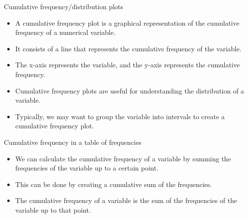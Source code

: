 \documentclass[
  10pt,
  ignorenonframetext,
]{beamer}
\begin{document}
\begin{frame}{Cumulative frequency/distribution plots}
\label{cumulative-frequencydistribution-plots}
\begin{itemize}
\item
  A cumulative frequency plot is a graphical representation of the
  cumulative frequency of a numerical variable.
\item
  It consists of a line that represents the cumulative frequency of the
  variable.
\item
  The x-axis represents the variable, and the y-axis represents the
  cumulative frequency.
\item
  Cumulative frequency plots are useful for understanding the
  distribution of a variable.
\item
  Typically, we may want to group the variable into intervals to create
  a cumulative frequency plot.
\end{itemize}
\end{frame}

\begin{frame}{Cumulative frequency in a table of frequencies}
\label{cumulative-frequency-in-a-table-of-frequencies}
\begin{itemize}
\item
  We can calculate the cumulative frequency of a variable by summing the
  frequencies of the variable up to a certain point.
\item
  This can be done by creating a cumulative sum of the frequencies.
\item
  The cumulative frequency of a variable is the sum of the frequencies
  of the variable up to that point.
\end{itemize}
\end{frame}
\end{document}

